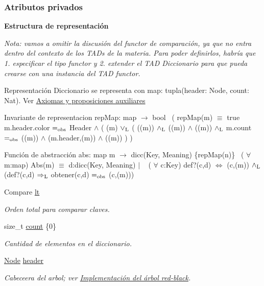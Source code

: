 \subsubsection*{Atributos privados}
\begin{Indent}{\bf Estructura de representación}\par
{\em Nota\+: vamos a omitir la discusión del functor de comparación, ya que no entra dentro del contexto de los T\+A\+Ds de la materia. Para poder definirlos, habría que 1. especificar el tipo functor y 2. extender el T\+AD Diccionario para que pueda crearse con una instancia del T\+AD functor.

\begin{DoxyParagraph}{Representación}
Diccionario se representa con map\+: tupla(header\+: Node, count\+: Nat). Ver \hyperlink{axiomas}{Axiomas y proposiciones auxiliares}
\end{DoxyParagraph}
\begin{DoxyParagraph}{Invariante de representacion}
rep\+Map\+: map $\to$ bool~\newline
( rep\+Map(m) $\equiv$ true  m.\+header.\+color $=_{\rm obs}$ Header $\land$ ( (m) $\lor_{\rm L}$ ( ((m)) $\land_{\rm L}$ ((m)) $\land$ ((m)) $\land_{\rm L}$ m.\+count $=_{\rm obs}$ ((m)) $\land$ (m.\+header,(m)) $\land$ ((m)) ) ) 
\end{DoxyParagraph}


\begin{DoxyParagraph}{Función de abstracción}
abs\+: map m $\to$ dicc(Key, Meaning) \{rep\+Map(n)\}~\newline
 ( $\forall$ m\+:map) Abs(m) $\equiv$ d\+:dicc(Key, Meaning) $\vert$ ~\newline
 ( $\forall$ c\+:Key) def?(c,d) $\Leftrightarrow$ (c,(m)) $\land_{\rm L}$ (def?(c,d) $\Rightarrow_{\rm L}$ obtener(c,d) $=_{\rm obs}$ (c,(m))) 
\end{DoxyParagraph}
}\begin{DoxyCompactItemize}
\item 
Compare \hyperlink{classaed2_1_1map_a0e5be36fae0693e4665bd2a615e7550a_a0e5be36fae0693e4665bd2a615e7550a}{lt}
\begin{DoxyCompactList}\small\item\em Orden total para comparar claves. \end{DoxyCompactList}\item 
size\+\_\+t \hyperlink{classaed2_1_1map_a44236c4f16cdc20a10759862b198bde4_a44236c4f16cdc20a10759862b198bde4}{count} \{0\}
\begin{DoxyCompactList}\small\item\em Cantidad de elementos en el diccionario. \end{DoxyCompactList}\item 
\hyperlink{structaed2_1_1map_1_1Node}{Node} \hyperlink{classaed2_1_1map_a92d93f905c8ad73fba18fdc7e8915cce_a92d93f905c8ad73fba18fdc7e8915cce}{header}
\begin{DoxyCompactList}\small\item\em Cabeceera del arbol; ver \hyperlink{Implementacion}{Implementación del árbol red-\/black}. \end{DoxyCompactList}\end{DoxyCompactItemize}
\end{Indent}
